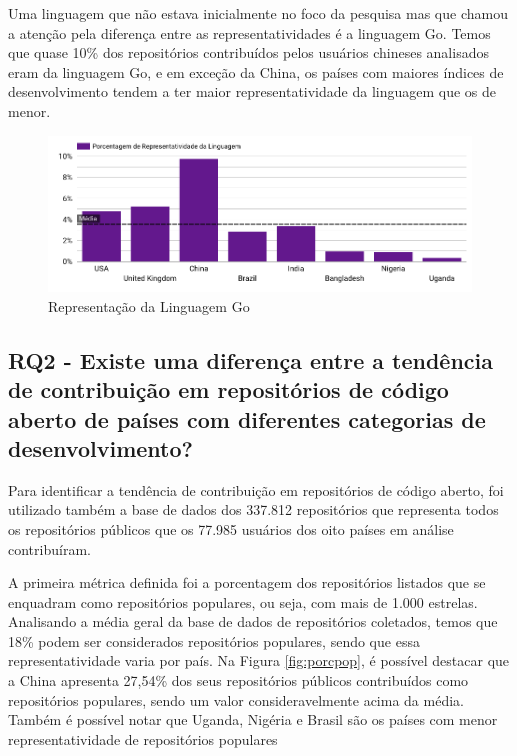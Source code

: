\documentclass[12pt]{article}
\begin{document}
Uma linguagem que não estava inicialmente no foco da pesquisa mas que chamou a atenção pela diferença entre as representatividades é a linguagem Go. Temos que quase 10\% dos repositórios contribuídos pelos usuários chineses analisados eram da linguagem Go, e em exceção da China, os países com maiores índices de desenvolvimento tendem a ter maior representatividade da linguagem que os de menor.

\begin{figure}[H]
\centering
\includegraphics[width=1\textwidth]{img/rq1/go.png}
\caption{Representação da Linguagem Go}
\label{fig:go}
\end{figure}


\subsection{RQ2 - Existe uma diferença entre a tendência de contribuição em repositórios de código aberto de países com diferentes categorias de desenvolvimento?}

Para identificar a tendência de contribuição em repositórios de código aberto, foi utilizado também a base de dados dos 337.812 repositórios que representa todos os repositórios públicos que os 77.985 usuários dos oito países em análise contribuíram. 

A primeira métrica definida foi a porcentagem dos repositórios listados que se enquadram como repositórios populares, ou seja, com mais de 1.000 estrelas. Analisando a média geral da base de dados de repositórios coletados, temos que 18\% podem ser considerados repositórios populares, sendo que essa representatividade varia por país. Na Figura \ref{fig:porcpop}, é possível destacar que a China apresenta 27,54\% dos seus repositórios públicos contribuídos como repositórios populares, sendo um valor consideravelmente acima da média. Também é possível notar que Uganda, Nigéria e Brasil são os países com menor representatividade de repositórios populares
\end{document}
